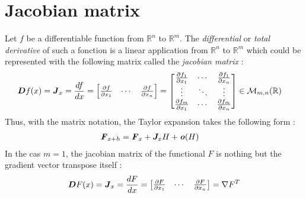 \section{Jacobian matrix}
Let $f$ be a differentiable function from $\mathbb{R}^n$ to $\mathbb{R}^m$. The \emph{differential} or \emph{total derivative} of such a fonction is a linear application from $\mathbb{R}^n$ to $\mathbb{R}^m$ which could be represented with the following matrix called the \emph{jacobian matrix} :
\begin{align}
	&\boldsymbol{D}f(x) = \boldsymbol{\mathit{J}}_x = \frac{df}{dx} =
	\begin{bmatrix}
		\frac{\partial f}{\partial x_1}&\cdots&\frac{\partial f}{\partial x_n}
	\end{bmatrix}=
	\begin{bmatrix}
		\frac{\partial f_1}{\partial x_1} & \cdots & \frac{\partial f_1}{\partial x_n} \\
		\vdots & \ddots & \vdots \\
		\frac{\partial f_m}{\partial x_1} & \cdots & \frac{\partial f_m}{\partial x_n}
	\end{bmatrix}
	\in\mathcal{M}_{m,n}(\mathbb{R})
\end{align}
Thus, with the matrix notation, the Taylor expansion takes the following form :
\begin{align}
	&\boldsymbol{\mathit{F}}_{x+h} = \boldsymbol{\mathit{F}}_{x} +  \boldsymbol{J}_x H + \boldsymbol{\mathit{o}}(H)
\end{align}
In the cas $m=1$, the jacobian matrix of the functional $F$ is nothing but the gradient vector transpose itself :
\begin{align}
	\boldsymbol{D}F(x) = \boldsymbol{\mathit{J}}_x = \frac{dF}{dx} =
	\begin{bmatrix}
		\frac{\partial F}{\partial x_1}& \cdots&\frac{\partial F}{\partial x_n}
	\end{bmatrix} = \nabla F^T
\end{align}

